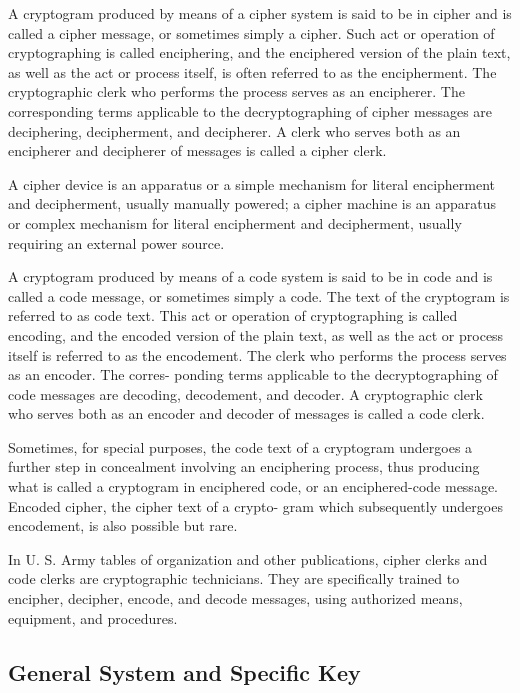 \mypara A cryptogram produced by means of a cipher system is said to be
in cipher and is called a cipher message, or sometimes simply a cipher.
Such act or operation of cryptographing is called enciphering, and the
enciphered version of the plain text, as well as the act or process itself,
is often referred to as the encipherment. The cryptographic clerk who
performs the process serves as an encipherer. The corresponding terms
applicable to the decryptographing of cipher messages are deciphering,
decipherment, and decipherer. A clerk who serves both as an encipherer
and decipherer of messages is called a cipher clerk.

\mypara A cipher device is an apparatus or a simple mechanism for literal
encipherment and decipherment, usually manually powered; a cipher
machine is an apparatus or complex mechanism for literal encipherment
and decipherment, usually requiring an external power source.

\mypara A cryptogram produced by means of a code system is said to be
in code and is called a code message, or sometimes simply a code. The
text of the cryptogram is referred to as code text. This act or operation
of cryptographing is called encoding, and the encoded version of the plain
text, as well as the act or process itself is referred to as the encodement.
The clerk who performs the process serves as an encoder. The corres-
ponding terms applicable to the decryptographing of code messages are
decoding, decodement, and decoder. A cryptographic clerk who serves
both as an encoder and decoder of messages is called a code clerk.

\mypara Sometimes, for special purposes, the code text of a cryptogram
undergoes a further step in concealment involving an enciphering process,
thus producing what is called a cryptogram in enciphered code, or an
enciphered-code message. Encoded cipher, the cipher text of a crypto-
gram which subsequently undergoes encodement, is also possible but rare.

\mypara In U. S. Army tables of organization and other publications, cipher
clerks and code clerks are cryptographic technicians. They are speciﬁcally
trained to encipher, decipher, encode, and decode messages, using
authorized means, equipment, and procedures.

\subsection{General System and Speciﬁc Key}

